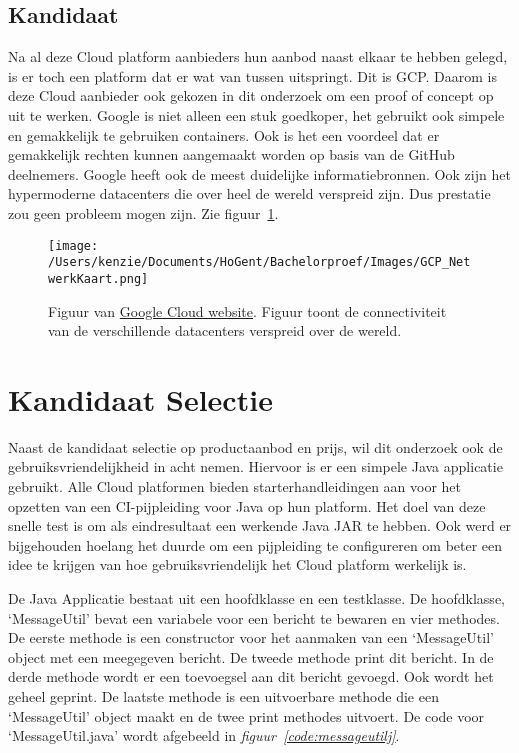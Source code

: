 \subsection{Kandidaat}
Na al deze Cloud platform aanbieders hun aanbod naast elkaar te hebben gelegd, is er toch een platform dat er wat van tussen uitspringt. Dit is GCP. Daarom is deze Cloud aanbieder ook gekozen in dit onderzoek om een proof of concept op uit te werken. Google is niet alleen een stuk goedkoper, het gebruikt ook simpele en gemakkelijk te gebruiken containers. Ook is het een voordeel dat er gemakkelijk rechten kunnen aangemaakt worden op basis van de GitHub deelnemers. Google heeft ook de meest duidelijke informatiebronnen. Ook zijn het hypermoderne datacenters die over heel de wereld verspreid zijn. Dus prestatie zou geen probleem mogen zijn. Zie figuur~\ref{fig:GCP_NetwerkKaart}.

\begin{figure}[!htbp]
    \centering
    \texttt{[image: /Users/kenzie/Documents/HoGent/Bachelorproef/Images/GCP\_NetwerkKaart.png]}
    \caption{Figuur van \href{}{Google Cloud website}. Figuur toont de connectiviteit van de verschillende datacenters verspreid over de wereld.}
    \label{fig:GCP_NetwerkKaart}
\end{figure}

\section{Kandidaat Selectie}
\label{sec:KandidaatSelectie}
Naast de kandidaat selectie op productaanbod en prijs, wil dit onderzoek ook de gebruiksvriendelijkheid in acht nemen. Hiervoor is er een simpele Java applicatie gebruikt. Alle Cloud platformen bieden starterhandleidingen aan voor het opzetten van een CI-pijpleiding voor Java op hun platform. Het doel van deze snelle test is om als eindresultaat een werkende Java JAR te hebben. Ook werd er bijgehouden hoelang het duurde om een pijpleiding te configureren om beter een idee te krijgen van hoe gebruiksvriendelijk het Cloud platform werkelijk is. 

De Java Applicatie bestaat uit een hoofdklasse en een testklasse. De hoofdklasse, ‘MessageUtil’ bevat een variabele voor een bericht te bewaren en vier methodes. De eerste methode is een constructor voor het aanmaken van een ‘MessageUtil’ object met een meegegeven bericht. De tweede methode print dit bericht. In de derde methode wordt er een toevoegsel aan dit bericht gevoegd. Ook wordt het geheel geprint. De laatste methode is een uitvoerbare methode die een ‘MessageUtil’ object maakt en de twee print methodes uitvoert. De code voor ‘MessageUtil.java’ wordt afgebeeld in \emph{figuur~\ref{code:messageutilj}}. 

